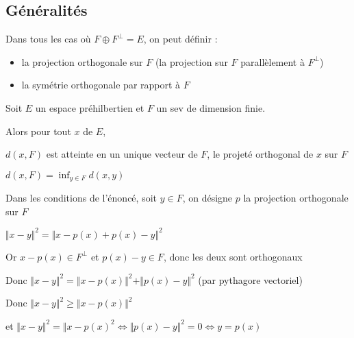 \documentclass[a4paper,12pt]{book}
\newcommand{\Def}[2]{\begin{tcolorbox}[sharp corners, colback=white,colframe=blue!90!black!75, title=Définition : #1]#2\end{tcolorbox}}
\newcommand{\Thr}[2]{\begin{tcolorbox}[sharp corners, colback=white,colframe=red!90!black!75, title=Théorème : #1]#2\end{tcolorbox}}
\newcommand{\Pre}[1]{\begin{tcolorbox}[sharp corners, colback=white,colframe=green!60!green!30!black!75, title=Preuve]#1\end{tcolorbox}}
\begin{document}
\subsection{Généralités}
\Def{}{Dans tous les cas où $F\oplus F^\perp = E$, on peut définir :\begin{itemize}
\item la projection orthogonale sur $F$ (la projection sur $F$ parallèlement à $F^\perp$)
\item la symétrie orthogonale par rapport à $F$
\end{itemize}}
\Thr{de la meilleure approximation}{Soit $E$ un espace préhilbertien et $F$ un sev de dimension finie.
\par Alors pour tout $x$ de $E$,
\par \begin{center} $d(x,F)$ est atteinte en un unique vecteur de $F$, le projeté orthogonal de $x$ sur $F$\end{center}}
\Pre{$d(x, F) = \inf_{y\in F}d(x, y)$
\par Dans les conditions de l'énoncé, soit $y\in F$, on désigne $p$ la projection orthogonale sur $F$
\par $\Vert x-y\Vert^2 = \Vert x-p(x)+p(x)-y\Vert^2$
\par Or $x-p(x)\in F^\perp$ et $p(x)-y\in F$, donc les deux sont orthogonaux
\par Donc $\Vert x-y\Vert^2 = \Vert x - p(x)\Vert^2 + \Vert p(x)-y\Vert^2$ (par pythagore vectoriel)
\par Donc $\Vert x-y\Vert^2\geq \Vert x-p(x)\Vert^2$
\par et $\Vert x-y\Vert^2=\Vert x-p(x)^2\Leftrightarrow \Vert p(x)-y\Vert^2=0\Leftrightarrow y=p(x)$}
\end{document}
